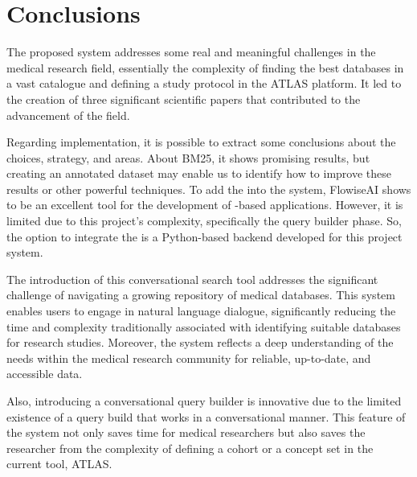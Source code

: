 \chapter{Conclusions}
\label{chapter:Conclusions}




The proposed system addresses some real and meaningful challenges in the medical research field, essentially the complexity of finding the best databases in a vast catalogue and defining a study protocol in the ATLAS platform. It led to the creation of three significant scientific papers that contributed to the advancement of the field.

Regarding implementation, it is possible to extract some conclusions about the choices, strategy, and areas. About BM25, it shows promising results, but creating an annotated dataset may enable us to identify how to improve these results or other powerful {\ir} techniques. To add the {\llm} into the system, FlowiseAI shows to be an excellent tool for the development of {\llm}-based applications. However, it is limited due to this project's complexity, specifically the query builder phase. So, the option to integrate the {\llm} is a Python-based backend developed for this project system.

The introduction of this conversational search tool addresses the significant challenge of navigating a growing repository of medical databases. This system enables users to engage in natural language dialogue, significantly reducing the time and complexity traditionally associated with identifying suitable databases for research studies. Moreover, the system reflects a deep understanding of the needs within the medical research community for reliable, up-to-date, and accessible data.

Also, introducing a conversational query builder is innovative due to the limited existence of a query build that works in a conversational manner. This feature of the system not only saves time for medical researchers but also saves the researcher from the complexity of defining a cohort or a concept set in the current tool, ATLAS.

